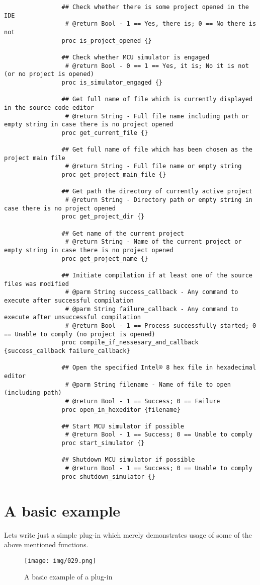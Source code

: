 \documentclass[a4paper,twoside,12pt]{book}
\newcommand{\mysmallfont}{\fontsize{8pt}{10pt} \selectfont{}}
\begin{document}
		{
			\mysmallfont{}
			\begin{verbatim}
				## Check whether there is some project opened in the IDE
				 # @return Bool - 1 == Yes, there is; 0 == No there is not
				proc is_project_opened {}

				## Check whether MCU simulator is engaged
				 # @return Bool - 0 == 1 == Yes, it is; No it is not (or no project is opened)
				proc is_simulator_engaged {}

				## Get full name of file which is currently displayed in the source code editor
				 # @return String - Full file name including path or empty string in case there is no project opened
				proc get_current_file {}

				## Get full name of file which has been chosen as the project main file
				 # @return String - Full file name or empty string
				proc get_project_main_file {}

				## Get path the directory of currently active project
				 # @return String - Directory path or empty string in case there is no project opened
				proc get_project_dir {}

				## Get name of the current project
				 # @return String - Name of the current project or empty string in case there is no project opened
				proc get_project_name {}

				## Initiate compilation if at least one of the source files was modified
				 # @parm String success_callback - Any command to execute after successful compilation
				 # @parm String failure_callback - Any command to execute after unsuccessful compilation
				 # @return Bool - 1 == Process successfully started; 0 == Unable to comply (no project is opened)
				proc compile_if_nessesary_and_callback {success_callback failure_callback}

				## Open the specified Intel® 8 hex file in hexadecimal editor
				 # @parm String filename - Name of file to open (including path)
				 # @return Bool - 1 == Success; 0 == Failure
				proc open_in_hexeditor {filename}

				## Start MCU simulator if possible
				 # @return Bool - 1 == Success; 0 == Unable to comply
				proc start_simulator {}

				## Shutdown MCU simulator if possible
				 # @return Bool - 1 == Success; 0 == Unable to comply
				proc shutdown_simulator {}
			\end{verbatim}
		}

	\section{A basic example}
		Lets write just a simple plug-in which merely demonstrates usage of some of the above mentioned functions.
		\begin{figure}[h!]
			\centering{}
			\texttt{[image: img/029.png]}
			\caption{A basic example of a plug-in}
		\end{figure}
\end{document}
